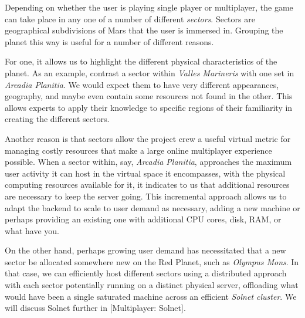 

Depending on whether the user is playing single player or multiplayer, the game can take place in any one of a number of different {\it sectors}. Sectors are geographical subdivisions of Mars that the user is immersed in. Grouping the planet this way is useful for a number of different reasons.

For one, it allows us to highlight the different physical characteristics of the planet. As an example, contrast a sector within {\it Valles Marineris} with one set in {\it Arcadia Planitia}. We would expect them to have very different appearances, geography, and maybe even contain some resources not found in the other. This allows experts to apply their knowledge to specific regions of their familiarity in creating the different sectors.

Another reason is that sectors allow the project crew a useful virtual metric for managing costly resources that make a large online multiplayer experience possible. When a sector within, say, {\it Arcadia Planitia}, approaches the maximum user activity it can host in the virtual space it encompasses, with the physical computing resources available for it, it indicates to us that additional resources are necessary to keep the server going. This incremental approach allows us to adapt the backend to scale to user demand as necessary, adding a new machine or perhaps providing an existing one with additional CPU cores, disk, RAM, or what have you. 

On the other hand, perhaps growing user demand has necessitated that a new sector be allocated somewhere new on the Red Planet, such as {\it Olympus Mons}. In that case, we can efficiently host different sectors using a distributed approach with each sector potentially running on a distinct physical server, offloading what would have been a single saturated machine across an efficient {\it Solnet cluster}. We will discuss Solnet further in [Multiplayer: Solnet].

